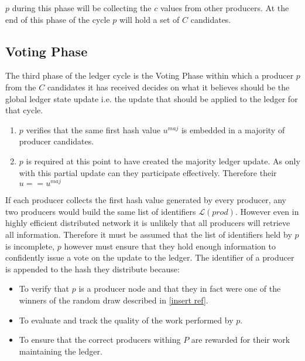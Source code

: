 \documentclass{article}
\begin{document}
$p$ during this phase will be collecting the $c$ values from other producers. At the end of this phase of the cycle $p$ will hold a set of $C$ candidates.



\subsection{Voting Phase}

The third phase of the ledger cycle is the Voting Phase within which a producer $p$ from the $C$ candidates it has received decides on what it believes should be the global ledger state update i.e. the update that should be applied to the ledger for that cycle.



\begin{enumerate}
\item $p$ verifies that the same first hash value $u^{maj}$ is embedded in a majority of producer candidates.
\item $p$ is required at this point to have created the majority ledger update. As only with this partial update can they participate effectively. Therefore their $u == u^{maj}$

\end{enumerate}

If each producer collects the first hash value generated by every producer, any two producers would build the same list of identifiers $\mathcal{L}(prod)$. However even in highly efficient distributed network it is unlikely that all producers will retrieve all information. Therefore it must be assumed that the list of identifiers held by $p$ is incomplete, $p$ however must ensure that they hold enough information to confidently issue a vote on the update to the ledger. The identifier of a producer is appended to the hash they distribute because:

\begin{itemize}
\item To verify that $p$ is a producer node and that they in fact were one of the winners of the random draw described in \ref{insert ref}.
\item To evaluate and track the quality of the work performed by $p$.
\item To ensure that the correct producers withing $P$ are rewarded for their work maintaining the ledger. \\

\end{itemize}
\end{document}
